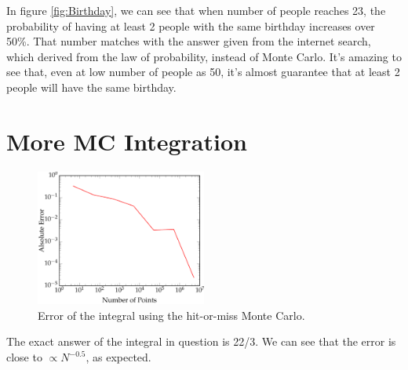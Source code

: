 \documentclass[11pt,letterpaper]{article}
\begin{document}
In figure \ref{fig:Birthday}, we can see that when number of people reaches 23, the probability of having at least 2 people with the same birthday increases over 50\%. That number matches with the answer given from the internet search, which derived from the law of probability, instead of Monte Carlo. It's amazing to see that, even at low number of people as 50, it's almost guarantee that at least 2 people will have the same birthday.

\newpage
\section{More MC Integration}

\begin{figure}[h!]
	\centering
	\includegraphics[width=0.5\textwidth]{HitMiss}
	\caption{Error of the integral using the hit-or-miss Monte Carlo.}
	\label{fig:HitMiss}
\end{figure}

The exact answer of the integral in question is 22/3. We can see that the error is close to $\propto N^{-0.5}$, as expected.
\end{document}
